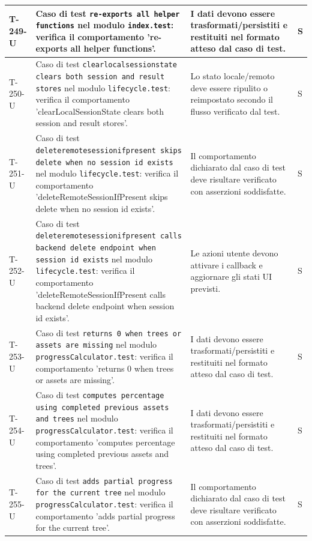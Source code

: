 \documentclass[a4paper,12pt]{article}
\begin{document}
{{\begin{longtable}{|>{\RaggedRight\arraybackslash}p{1.55cm}|>{\RaggedRight\arraybackslash}p{8.0cm}|>{\RaggedRight\arraybackslash}p{4.6cm}|>{\RaggedRight\arraybackslash}p{1.2cm}|}
        \hline
        T-249-U & Caso di test \texttt{re-exports all helper functions} nel modulo \texttt{index.test}: verifica il comportamento 're-exports all helper functions'. & I dati devono essere trasformati/persistiti e restituiti nel formato atteso dal caso di test. & S \\
        \hline
        T-250-U & Caso di test \texttt{clearlocalsessionstate clears both session and result stores} nel modulo \texttt{lifecycle.test}: verifica il comportamento 'clearLocalSessionState clears both session and result stores'. & Lo stato locale/remoto deve essere ripulito o reimpostato secondo il flusso verificato dal test. & S \\
        \hline
        T-251-U & Caso di test \texttt{deleteremotesessionifpresent skips delete when no session id exists} nel modulo \texttt{lifecycle.test}: verifica il comportamento 'deleteRemoteSessionIfPresent skips delete when no session id exists'. & Il comportamento dichiarato dal caso di test deve risultare verificato con asserzioni soddisfatte. & S \\
        \hline
        T-252-U & Caso di test \texttt{deleteremotesessionifpresent calls backend delete endpoint when session id exists} nel modulo \texttt{lifecycle.test}: verifica il comportamento 'deleteRemoteSessionIfPresent calls backend delete endpoint when session id exists'. & Le azioni utente devono attivare i callback e aggiornare gli stati UI previsti. & S \\
        \hline
        T-253-U & Caso di test \texttt{returns 0 when trees or assets are missing} nel modulo \texttt{progressCalculator.test}: verifica il comportamento 'returns 0 when trees or assets are missing'. & I dati devono essere trasformati/persistiti e restituiti nel formato atteso dal caso di test. & S \\
        \hline
        T-254-U & Caso di test \texttt{computes percentage using completed previous assets and trees} nel modulo \texttt{progressCalculator.test}: verifica il comportamento 'computes percentage using completed previous assets and trees'. & I dati devono essere trasformati/persistiti e restituiti nel formato atteso dal caso di test. & S \\
        \hline
        T-255-U & Caso di test \texttt{adds partial progress for the current tree} nel modulo \texttt{progressCalculator.test}: verifica il comportamento 'adds partial progress for the current tree'. & Il comportamento dichiarato dal caso di test deve risultare verificato con asserzioni soddisfatte. & S \\

\end{longtable}}}
\end{document}
